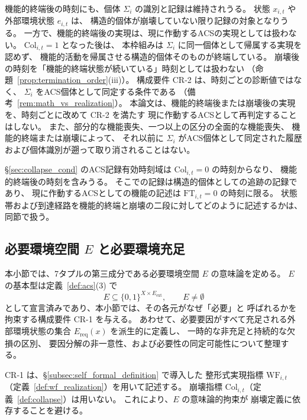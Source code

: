 \begin{remark}[機能的終端後と崩壊後の記録]
\label{rem:post_collapse_record}
機能的終端後の時刻にも、個体 $\Sigma_i$ の識別と記録は維持されうる。
状態 $x_{i,t}$ や外部環境状態 $e_{i,t}$ は、
構造的個体が崩壊していない限り記録の対象となりうる。
一方で、機能的終端後の実現は、現に作動するACSの実現としては扱わない。
$\mathrm{Col}_{i,t}=1$ となった後は、
本枠組みは $\Sigma_i$ に同一個体として帰属する実現を認めず、
機能的活動を帰属させる構造的個体そのものが終端している。
崩壊後の時刻を「機能的終端状態が続いている」時刻としては扱わない
（命題~\ref{prop:termination_order}(iii)）。
構成要件 CR-2 は、時刻ごとの診断値ではなく、
$\Sigma_i$ をACS個体として同定する条件である
（備考~\ref{rem:math_vs_realization}）。
本論文は、機能的終端後または崩壊後の実現を、時刻ごとに改めて CR-2 を満たす
現に作動するACSとして再判定することはしない。
また、部分的な機能喪失、一つ以上の区分の全面的な機能喪失、
機能的終端または崩壊によって、
それ以前に $\Sigma_i$ がACS個体として同定された履歴
および個体識別が遡って取り消されることはない。

\S\ref{sec:collapse_cond} のACS記録有効時刻域は $\mathrm{Col}_{i,t}=0$ の時刻からなり、
機能的終端後の時刻を含みうる。
そこでの記録は構造的個体としての追跡の記録であり、
現に作動するACSとしての機能の記述は $\mathrm{FT}_{i,t}=0$ の時刻に限る。
状態帯および到達経路を機能的終端と崩壊の二段に対してどのように記述するかは、
同節で扱う。
\end{remark}

\subsection{必要環境空間 $E$ と必要環境充足}
\label{subsec:environment_space}

本小節では、7タプルの第三成分である必要環境空間 $E$ の意味論を定める。
$E$ の基本型は定義~\ref{def:acs}(3) で
\[
  E\subseteq\{0,1\}^{X\times E_{\mathrm{ext}}},
  \qquad
  E\neq\emptyset
\]
として宣言済みであり、本小節では、その各元がなぜ「必要」と
呼ばれるかを拘束する構成要件 CR-1 を与える。
あわせて、必要要因がすべて充足される外部環境状態の集合
$E_{\mathrm{req}}(x)$ を派生的に定義し、
一時的な非充足と持続的な欠損の区別、
要因分解の非一意性、および必要性の同定可能性について整理する。

CR-1 は、\S\ref{subsec:self_formal_definition} で導入した
整形式実現指標 $\mathrm{WF}_{i,t}$
（定義~\ref{def:wf_realization}）を用いて記述する。
崩壊指標 $\mathrm{Col}_{i,t}$（定義~\ref{def:collapse}）は用いない。
これにより、$E$ の意味論的拘束が
崩壊定義に依存することを避ける。

